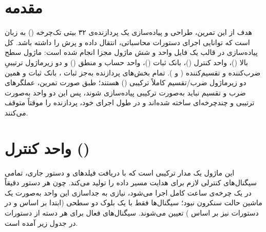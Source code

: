 \section{مقدمه}
هدف از این تمرین، طراحی و پیاده‌سازی یک پردازنده‌ی ۳۲ بیتی تک‌چرخه () به زبان  است که توانایی اجرای دستورات محاسباتی، انتقال داده و پرش را داشته باشد. کل پیاده‌سازی در قالب یک فایل واحد و شش ماژول مجزا انجام شده است: ماژول سطح بالا ()، واحد کنترل ()، بانک ثبات ()، واحد حساب و منطق () و دو زیرماژول ترتیبیِ ضرب‌کننده و تقسیم‌کننده ( و ). تمام بخش‌های پردازنده به‌جز ثبات ، بانک ثبات و همین دو زیرماژول ضرب/تقسیم کاملاً ترکیبی () هستند؛ طبق صورت تمرین، عملگرهای ضرب و تقسیم نباید به‌صورت ترکیبی پیاده‌سازی شوند، پس این دو واحد به‌صورت ترتیبی و چندچرخه‌ای ساخته شده‌اند و در طول اجرای خود، پردازنده را موقتاً متوقف می‌کنند.
\section{واحد کنترل ()}
این ماژول یک مدار ترکیبی است که با دریافت فیلدهای  و  دستور جاری، تمامی سیگنال‌های کنترلی لازم برای هدایت مسیر داده را تولید می‌کند. چون هر دستور دقیقاً در یک چرخه‌ی ساعت کامل اجرا می‌شود، نیازی به جداسازی این واحد به‌صورت یک ماشین حالت سنکرون نبود؛ سیگنال‌ها فقط با یک بلوک  دو سطحی (ابتدا بر اساس  و در دستورات  نیز بر اساس ) تعیین می‌شوند. سیگنال‌های فعال برای هر دسته از دستورات در جدول زیر آمده است.


